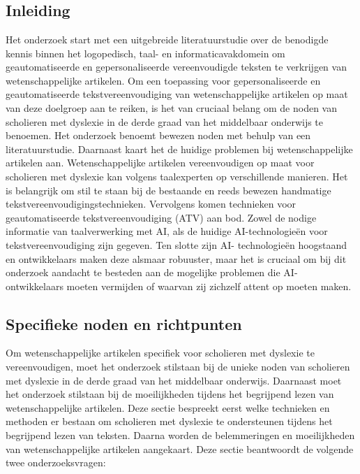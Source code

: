 \chapter{}%
\label{ch:stand-van-zaken}

\section{Inleiding}

Het onderzoek start met een uitgebreide literatuurstudie over de benodigde kennis binnen het logopedisch, taal- en informaticavakdomein om geautomatiseerde en gepersonaliseerde vereenvoudigde teksten te verkrijgen van wetenschappelijke artikelen. Om een toepassing voor gepersonaliseerde en geautomatiseerde tekstvereenvoudiging van wetenschappelijke artikelen  op maat van deze doelgroep aan te reiken, is het van cruciaal belang om de noden van scholieren met dyslexie in de derde graad van het middelbaar onderwijs te benoemen. Het onderzoek benoemt bewezen noden met behulp van een literatuurstudie. Daarnaast kaart het de huidige problemen bij wetenschappelijke artikelen aan. Wetenschappelijke artikelen vereenvoudigen op maat voor scholieren met dyslexie kan volgens taalexperten op verschillende manieren. Het is belangrijk om stil te staan bij de bestaande en reeds bewezen handmatige tekstvereenvoudigingstechnieken. Vervolgens komen technieken voor geautomatiseerde tekstvereenvoudiging (ATV) aan bod. Zowel de nodige informatie van taalverwerking met AI, als de huidige AI-technologieën voor tekstvereenvoudiging zijn gegeven. Ten slotte zijn AI- technologieën hoogstaand en ontwikkelaars maken deze alsmaar robuuster, maar het is cruciaal om bij dit onderzoek aandacht te besteden aan de mogelijke problemen die AI- ontwikkelaars moeten vermijden of waarvan zij zichzelf attent op moeten maken. 

\section{Specifieke noden en richtpunten}

Om wetenschappelijke artikelen specifiek voor scholieren met dyslexie te vereenvoudigen, moet het onderzoek stilstaan bij de unieke noden van scholieren met dyslexie in de derde graad van het middelbaar onderwijs. Daarnaast moet het onderzoek stilstaan bij de moeilijkheden tijdens het begrijpend lezen van wetenschappelijke artikelen. Deze sectie bespreekt eerst welke technieken en methoden er bestaan om scholieren met dyslexie te ondersteunen tijdens het begrijpend lezen van teksten. Daarna worden de belemmeringen en moeilijkheden van wetenschappelijke artikelen aangekaart. Deze sectie beantwoordt de volgende twee onderzoeksvragen: 

